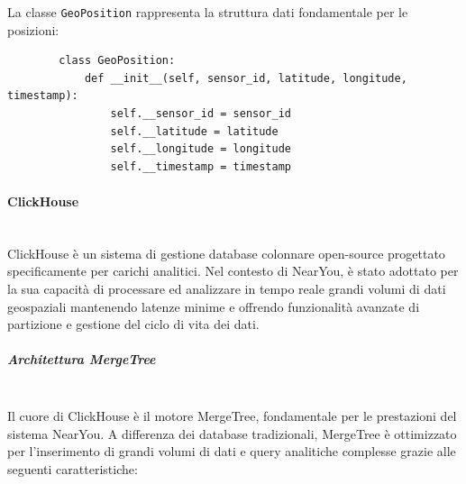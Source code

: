 \documentclass[10pt]{article}
\newcommand{\myparagraph}[1]{\paragraph{#1}\mbox{}\\}
\newcommand{\mysubparagraph}[1]{\subparagraph{#1}\mbox{}\\}
\begin{document}
        La classe \texttt{GeoPosition} rappresenta la struttura dati fondamentale per le posizioni:
        \begin{lstlisting}
        class GeoPosition:
            def __init__(self, sensor_id, latitude, longitude, timestamp):
                self.__sensor_id = sensor_id
                self.__latitude = latitude
                self.__longitude = longitude
                self.__timestamp = timestamp
        \end{lstlisting}
        \myparagraph{ClickHouse}
        ClickHouse è un sistema di gestione database colonnare open-source progettato specificamente per carichi analitici. Nel contesto di NearYou, è stato adottato per la sua capacità di processare ed analizzare in tempo reale grandi volumi di dati geospaziali mantenendo latenze minime e offrendo funzionalità avanzate di partizione e gestione del ciclo di vita dei dati.

        \mysubparagraph{Architettura MergeTree}
        Il cuore di ClickHouse è il motore MergeTree, fondamentale per le prestazioni del sistema NearYou. A differenza dei database tradizionali, MergeTree è ottimizzato per l'inserimento di grandi volumi di dati e query analitiche complesse grazie alle seguenti caratteristiche:
\end{document}
